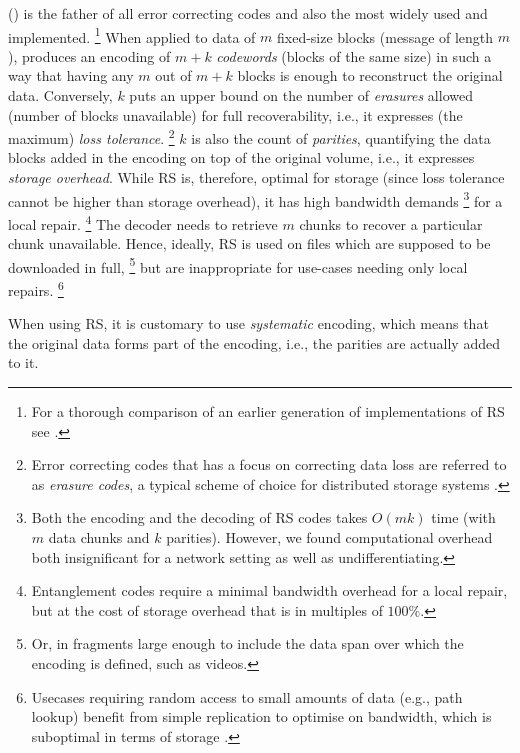  () \cite{lubyetal1995CRS,plank2006optimizing,li2013erasure} 
is the father of all  error correcting codes and also the most widely used and implemented.%
%
\footnote{%
For a thorough comparison of an earlier generation of implementations of RS see \cite{plank2009performance}.}
% 
When applied to data of $m$ fixed-size blocks (message of length $m$), produces an encoding of $m+k$ \emph{codewords} (blocks of the same size) 
in such a way that having any $m$ out of $m+k$ blocks is enough to reconstruct the original data. Conversely, $k$ puts an upper bound on the number of \emph{erasures} allowed (number of blocks unavailable) for full recoverability, i.e., it expresses (the maximum) \emph{loss tolerance}.%
%
\footnote{Error correcting codes that has a focus on correcting data loss are referred to as \emph{erasure codes}, a typical scheme of choice for distributed storage systems \cite{balaji2018erasure}.}
%
$k$ is also the count of \emph{parities}, quantifying the data blocks added in the encoding on top of the original volume, i.e., it expresses \emph{storage overhead}. While RS is, therefore, optimal for storage (since loss tolerance cannot be higher than storage overhead), 
it has high bandwidth demands%
%
\footnote{Both the encoding and the decoding of RS codes takes $O(mk)$ time (with $m$ data chunks and $k$ parities). However, we found computational overhead both insignificant for a network setting as well as undifferentiating.}
%
for a local repair.%
%
\footnote{Entanglement codes \cite{estrada2018alpha, estrada2019building} require a minimal bandwidth overhead for a local repair, but at the cost of storage overhead that is in multiples of $100\%$.}
%
The decoder needs to retrieve $m$ chunks to recover a particular chunk unavailable. 
Hence, ideally, RS is used on files which are supposed to be downloaded in full,%
%
\footnote{Or, in  fragments large enough  to include the data span over which the encoding is defined, such as videos.}%
%
but are inappropriate for use-cases needing only local repairs.%
%
\footnote{Usecases requiring random access to small amounts of data (e.g., path lookup) benefit from simple replication to optimise on bandwidth, which is suboptimal in terms of storage \cite{weatherspoon2002erasure}.}

When using RS, it is customary to use \emph{systematic} encoding, which means that the original data forms part of the encoding, i.e., the parities are actually added to it.%
%
%
% 
%


